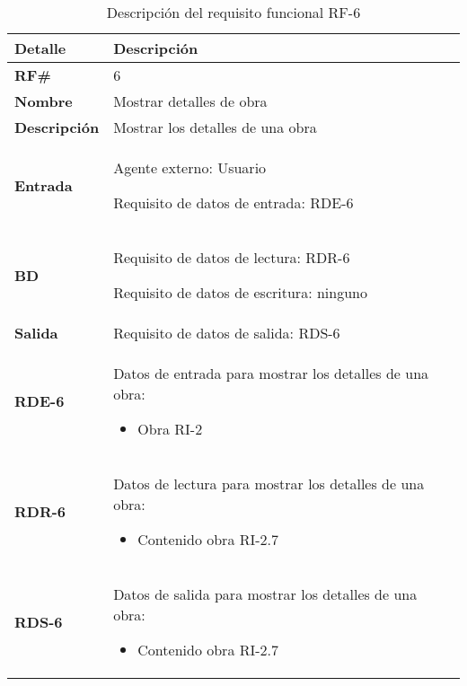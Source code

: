 \begin{table}[H]
    \centering
    \begin{tabular}{|p{3cm}|p{8cm}|}
        \hline
        \rowcolor{lightgray}
        \textbf{Detalle} & \textbf{Descripción} \\
        \hline
        \textbf{RF\#} & 6 \\
        \hline
        \textbf{Nombre} & Mostrar detalles de obra \\
        \hline
        \textbf{Descripción} & Mostrar los detalles de una obra \\
        \hline
        \textbf{Entrada} &
        Agente externo: Usuario
        
        Requisito de datos de entrada: RDE-6 \\
        \hline
        \textbf{BD} &
        Requisito de datos de lectura: RDR-6
        
        Requisito de datos de escritura: ninguno \\
        \hline
        \textbf{Salida} & Requisito de datos de salida: RDS-6 \\
        \hline
        \textbf{RDE-6} & Datos de entrada para mostrar los detalles de una obra:
            \begin{itemize}
                \item Obra RI-2
            \end{itemize} \\
        \hline
        \textbf{RDR-6} & Datos de lectura para mostrar los detalles de una obra:
            \begin{itemize}
                \item Contenido obra RI-2.7
            \end{itemize} \\
        \hline
        \textbf{RDS-6} & Datos de salida para mostrar los detalles de una obra:
            \begin{itemize}
                \item Contenido obra RI-2.7
            \end{itemize} \\
        \hline
    \end{tabular}
    \caption{Descripción del requisito funcional RF-6}
    \label{tab:rf-6}
\end{table}


